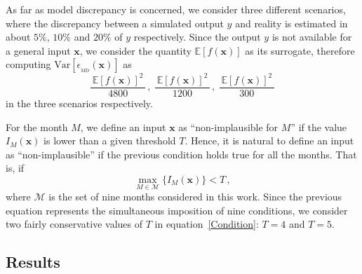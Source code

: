 \documentclass[a4paper, 12pt]{article}
\newcommand{\bd}[1]{\boldsymbol{#1}}
\newcommand{\x}{\bd x}
\newcommand{\E}{\mathbb{E}}
\newcommand{\Var}{\text{Var}}
\begin{document}
As far as model discrepancy is concerned, we consider three different scenarios, where the discrepancy between a simulated output $y$ and reality is estimated in about $5\%$, $10\%$ and $20\%$ of $y$ respectively. Since the output $y$ is not available for a general input $\x$, we consider the quantity $\E[f(\x)]$ as its surrogate, therefore computing $\Var[\epsilon_{_\text{MD}}(\x)]$
as
\begin{equation}
\frac{ \,{\E[f(\x)]}^2\, }{4800}\,, \;
\frac{ \,{\E[f(\x)]}^2\, }{1200}\,, \;
\frac{ \,{\E[f(\x)]}^2\, }{300}
\end{equation}
in the three scenarios respectively.



For the month $M$, we define an input $\x$ as ``non-implausible for $M$'' if the value $I_M(\x)$ is lower than a given threshold $T$. Hence, it is natural to define an input as ``non-implausible'' if the previous condition holds true for all the months. That is, if
\begin{equation}\label{Condition}
\max_{M \in \mathcal{M}} \big\{ I_M(\x) \big\} < T\,,
\end{equation}
where $\mathcal{M}$ is the set of nine months considered in this work. Since the previous equation represents the simultaneous imposition of nine conditions, we consider two fairly conservative values of $T$ in equation~\eqref{Condition}: $T=4$ and $T=5$.


\subsection{Results}
\end{document}
